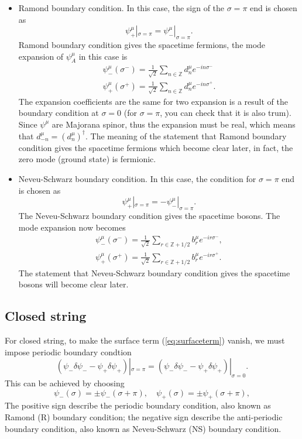 \documentclass[graybox,envcountchap,sectrefs]{svmono}
\begin{document}
\begin{itemize}
\item Ramond boundary condition. In this case, the sign of the $\sigma=\pi$ end is chosen as
\begin{equation}
	\psi_{+}^{\mu}|_{\sigma=\pi}=\psi_{-}^{\mu}|_{\sigma=\pi}.
\end{equation}
Ramond boundary condition gives the spacetime fermions, the mode expansion of $\psi^{\mu}_A$ in this case is
\begin{align}
\psi_{-}^{\mu}(\sigma^-)=\frac{1}{\sqrt{2}}\sum_{n\in\mathbb{Z}}d_{n}^{\mu}	e^{-in\sigma^-}\\
\psi_{+}^{\mu}(\sigma^+)=\frac{1}{\sqrt{2}}\sum_{n\in\mathbb{Z}}d_{n}^{\mu}	e^{-in\sigma^+}.
\end{align}
The expansion coefficients are the same for two expansion is a result of the boundary condition at $\sigma=0$ (for $\sigma=\pi$, you can check that it is also trum).
Since $\psi^{\mu}$ are Majorana spinor, thus the expansion must be real, which means that $d_{-n}^{\mu}=(d_n^{\mu})^{\dagger}$. The meaning of the statement that Ramond boundary condition gives the spacetime fermions which become clear later, in fact, the zero mode (ground state) is fermionic. 
\item Neveu-Schwarz boundary condition. In this case, the condition for $\sigma=\pi$ end is chosen as
\begin{equation}
	\psi_{+}^{\mu}|_{\sigma=\pi}=-\psi_{-}^{\mu}|_{\sigma=\pi}.	
\end{equation}
The Neveu-Schwarz boundary condition gives the spacetime bosons.
The mode expansion now becomes
\begin{align}
\psi^{\mu}_{-}(\sigma^-)=\frac{1}{\sqrt{2}}\sum_{r\in \mathbb{Z}+1/2}	b_{r}^{\mu}e^{-ir\sigma^-},\\
\psi^{\mu}_{+}(\sigma^+)=\frac{1}{\sqrt{2}}\sum_{r\in \mathbb{Z}+1/2}	b_{r}^{\mu}e^{-ir\sigma^+}.
\end{align}
The statement that Neveu-Schwarz boundary condition gives the spacetime bosons will become clear later.
\end{itemize}


\subsection{Closed string}
For closed string, to make the surface term (\ref{eq:surfaceterm}) vanish, we must impose periodic boundary condtion
\begin{equation}
\left(\psi_{-} \delta \psi_{-}-\psi_{+} \delta \psi_{+}\right)|_{\sigma=\pi}
=\left(\psi_{-} \delta \psi_{-}-\psi_{+} \delta \psi_{+}\right)|_{\sigma=0}.
\end{equation}
This can be achieved by choosing 
\begin{equation}
\psi_{-}(\sigma)=\pm\psi_{-}(\sigma+\pi),\quad
\psi_{+}(\sigma)=\pm\psi_{+}(\sigma+\pi)	,
\end{equation}
The positive sign describe the periodic boundary condition, also known as Ramond (R) boundary condition; the negative sign describe the anti-periodic boundary condition, also known as Neveu-Schwarz (NS) boundary condition.
\end{document}
